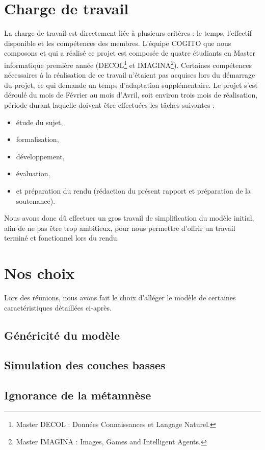 \section{Charge de travail}
La charge de travail est directement liée à plusieurs critères : le temps,
l'effectif disponible et les compétences des membres. L'équipe COGITO que nous 
composons et qui a réalisé ce projet est composée de
quatre étudiants en Master informatique première année (DECOL\footnote{Master
DECOL : Données Connaissances et Langage Naturel.} et IMAGINA\footnote{Master
IMAGINA : Images, Games and Intelligent Agents.}). Certaines compétences 
nécessaires à la réalisation de ce travail n'étaient pas
acquises lors du démarrage du projet, ce qui demande un temps d'adaptation
supplémentaire. Le projet s'est déroulé du mois de Février au mois d'Avril, soit environ trois
mois de réalisation, période durant laquelle doivent être effectuées les tâches
suivantes :

\begin{itemize}
\item étude du sujet, 
\item formalisation, 
\item développement, 
\item évaluation,
\item et préparation du rendu (rédaction du présent rapport et préparation de la soutenance).
\end{itemize}

Nous avons donc dû effectuer un gros travail de simplification du modèle
initial, afin de ne pas être trop ambitieux, pour nous permettre d'offrir un
travail terminé et fonctionnel lors du rendu.

\section{Nos choix}

Lors des réunions, nous avons fait le choix d'alléger le modèle de certaines caractéristiques détaillées ci-après.

\subsection{Généricité du modèle}
\subsection{Simulation des couches basses}
\subsection{Ignorance de la métamnèse}